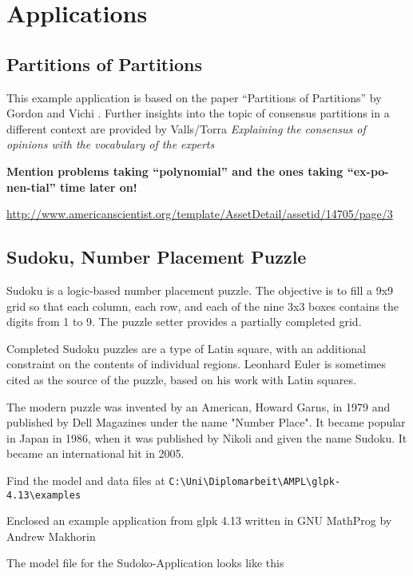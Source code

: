 
\chapter{Applications}
\label{sec:Applications}

\section{Partitions of Partitions}
\label{sec:PartitionsOfPartitions}

This example application is based on the paper ``Partitions of Partitions'' by Gordon and Vichi \cite{partitionsOfpartitions}.
Further insights into the topic of consensus partitions in a different context are provided by Valls/Torra \textit{Explaining the consensus of opinions with the vocabulary of the experts}\cite{ConsensusOpinions}

\bfseries
Mention problems taking ``polynomial'' and the ones taking ``ex-po-nen-tial'' time later on!

\url{http://www.americanscientist.org/template/AssetDetail/assetid/14705/page/3}

\section{Sudoku, Number Placement Puzzle}
\label{sec:Sudoku}

Sudoku is a logic-based number placement puzzle. The objective is to fill a 9x9 grid so that each column, each row, and each of the nine 3x3 boxes contains the digits from 1 to 9. The puzzle setter provides a partially completed grid.

Completed Sudoku puzzles are a type of Latin square, with an additional constraint on the contents of individual regions. Leonhard Euler is sometimes cited as the source of the puzzle, based on his work with Latin squares.

The modern puzzle was invented by an American, Howard Garns, in 1979 and published by Dell Magazines under the name "Number Place". It became popular in Japan in 1986, when it was published by Nikoli and given the name Sudoku. It became an international hit in 2005.\cite{wiki:sudoku}

Find the model and data files at \verb*|C:\Uni\Diplomarbeit\AMPL\glpk-4.13\examples|

Enclosed an example application from glpk 4.13 written in GNU MathProg by Andrew Makhorin


The model file for the Sudoko-Application looks like this

